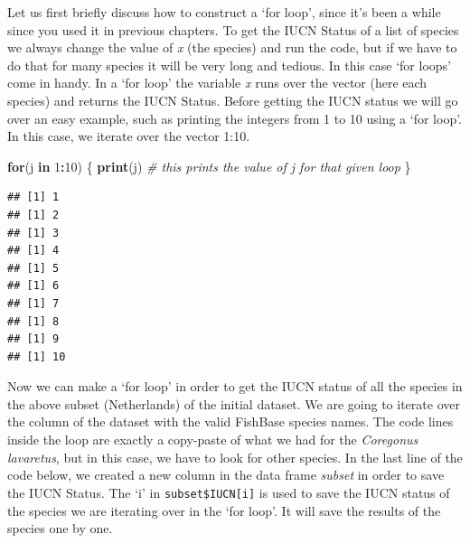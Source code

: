 \documentclass[
]{book}
\newenvironment{Shaded}{\begin{snugshade}}{\end{snugshade}}
\newcommand{\CommentTok}[1]{\textcolor[rgb]{0.56,0.35,0.01}{\textit{#1}}}
\newcommand{\ControlFlowTok}[1]{\textcolor[rgb]{0.13,0.29,0.53}{\textbf{#1}}}
\newcommand{\DecValTok}[1]{\textcolor[rgb]{0.00,0.00,0.81}{#1}}
\newcommand{\KeywordTok}[1]{\textcolor[rgb]{0.13,0.29,0.53}{\textbf{#1}}}
\newcommand{\NormalTok}[1]{#1}
\newcommand{\OperatorTok}[1]{\textcolor[rgb]{0.81,0.36,0.00}{\textbf{#1}}}
\newcommand{\StringTok}[1]{\textcolor[rgb]{0.31,0.60,0.02}{#1}}
\begin{document}
\begin{Shaded}
\end{Shaded}

Let us first briefly discuss how to construct a `for loop', since it's been a while since you used it in previous chapters. To get the IUCN Status of a list of species we always change the value of \emph{x} (the species) and run the code, but if we have to do that for many species it will be very long and tedious. In this case `for loops' come in handy. In a `for loop' the variable \emph{x} runs over the vector (here each species) and returns the IUCN Status. Before getting the IUCN status we will go over an easy example, such as printing the integers from 1 to 10 using a `for loop'. In this case, we iterate over the vector 1:10.

\begin{Shaded}
\begin{Highlighting}[]
\ControlFlowTok{for}\NormalTok{(j }\ControlFlowTok{in} \DecValTok{1}\OperatorTok{:}\DecValTok{10}\NormalTok{) \{}
\KeywordTok{print}\NormalTok{(j) }\CommentTok{# this prints the value of j for that given loop}
\NormalTok{\}}
\end{Highlighting}
\end{Shaded}

\begin{verbatim}
## [1] 1
## [1] 2
## [1] 3
## [1] 4
## [1] 5
## [1] 6
## [1] 7
## [1] 8
## [1] 9
## [1] 10
\end{verbatim}

Now we can make a `for loop' in order to get the IUCN status of all the species in the above subset (Netherlands) of the initial dataset. We are going to iterate over the column of the dataset with the valid FishBase species names. The code lines inside the loop are exactly a copy-paste of what we had for the \emph{Coregonus lavaretus}, but in this case, we have to look for other species. In the last line of the code below, we created a new column in the data frame \emph{subset} in order to save the IUCN Status. The `i' in \texttt{subset\$IUCN{[}i{]}} is used to save the IUCN status of the species we are iterating over in the `for loop'. It will save the results of the species one by one.
\end{document}
